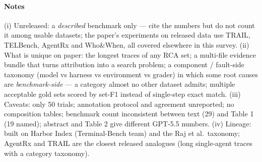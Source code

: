 \paragraph{Notes} (i) Unreleased: a \emph{described} benchmark only --- cite the numbers but do not count it among usable datasets; the paper's experiments on released data use TRAIL, TELBench, AgentRx and Who\&When, all covered elsewhere in this survey. (ii) What is unique on paper: the longest traces of any RCA set; a multi-file evidence bundle that turns attribution into a search problem; a component / fault-side taxonomy (model vs harness vs environment vs grader) in which some root causes are \emph{benchmark-side} --- a category almost no other dataset admits; multiple acceptable gold sets scored by set-F1 instead of single-step exact match. (iii) Caveats: only 50 trials; annotation protocol and agreement unreported; no composition tables; benchmark count inconsistent between text (29) and Table 1 (19 named); abstract and Table 2 give different GPT-5.5 numbers. (iv) Lineage: built on Harbor Index (Terminal-Bench team) and the Raj et al.\ taxonomy; AgentRx and TRAIL are the closest released analogues (long single-agent traces with a category taxonomy).
